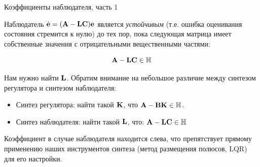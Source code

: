 \documentclass{beamer}
\begin{document}
\begin{frame}{Коэффициенты наблюдателя, часть 1}
	\begin{flushleft}
		
		Наблюдатель $\dot {\mathbf{e} }= (\mathbf{A} - \mathbf{L} \mathbf{C})\mathbf{e} $ является \emph{устойчивым} (т.е. ошибка оценивания состояния стремится к нулю) до тех пор, пока следующая матрица имеет собственные значения с отрицательными вещественными частями:
		
		\begin{equation}
			\mathbf{A} - 
			\mathbf{L} \mathbf{C} \in \mathbb{H}
		\end{equation}
		
		Нам нужно найти $\mathbf{L}$. Обратим внимание на небольшое различие между синтезом регулятора и синтезом наблюдателя:
		
		\bigskip
		
		\begin{itemize}
			\item Синтез регулятора: найти такой $\mathbf{K}$, что $\mathbf{A} - \mathbf{B} \mathbf{K} \in \mathbb{H}$.
			\item Синтез наблюдателя: найти такой $\mathbf{L}$, что: $\mathbf{A} - \mathbf{L} \mathbf{C} \in \mathbb{H}$
		\end{itemize}
		
		\bigskip
		
		Коэффициент в случае наблюдателя находится слева, что препятствует прямому применению наших инструментов синтеза (метод размещения полюсов, LQR) для его настройки.
		
	\end{flushleft}
\end{frame}
\end{document}
